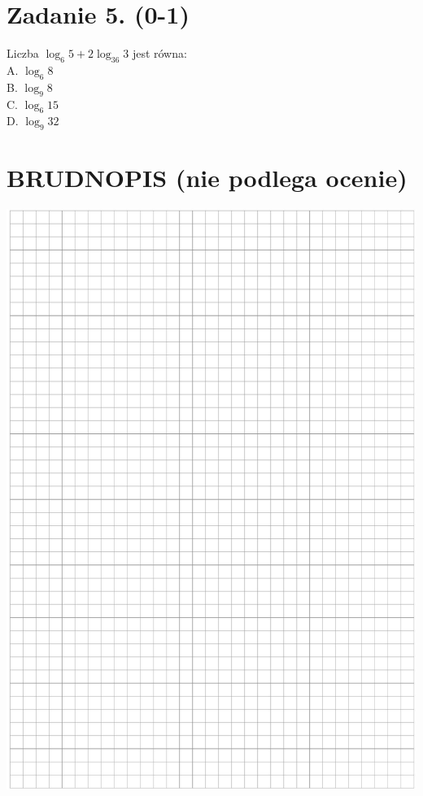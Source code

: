 \documentclass[10pt]{article}
\begin{document}
\section*{Zadanie 5. (0-1)}
Liczba \(\log _{6} 5+2 \log _{36} 3\) jest równa:\\
A. \(\log _{6} 8\)\\
B. \(\log _{9} 8\)\\
C. \(\log _{6} 15\)\\
D. \(\log _{9} 32\)

\section*{BRUDNOPIS (nie podlega ocenie)}
\begin{center}
\includegraphics[max width=\textwidth]{2024_11_21_c0ca116654784d42326bg-03}
\end{center}
\end{document}
